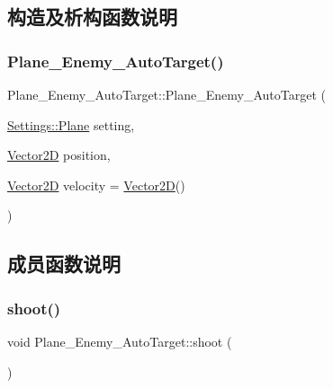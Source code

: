\subsection{构造及析构函数说明}
\mbox{\label{class_plane___enemy___auto_target_abf4224e6d4c79583016c98dc8747f3ad}} 
\subsubsection{\texorpdfstring{Plane\+\_\+\+Enemy\+\_\+\+Auto\+Target()}{Plane\_Enemy\_AutoTarget()}}
{\footnotesize\ttfamily Plane\+\_\+\+Enemy\+\_\+\+Auto\+Target\+::\+Plane\+\_\+\+Enemy\+\_\+\+Auto\+Target (\begin{DoxyParamCaption}\item[{\hyperlink{struct_settings_1_1_plane}{Settings\+::\+Plane}}]{setting,  }\item[{\hyperlink{_vector2_d_8hpp_aa1f1145650f1dd9bddf7335ec6434d7c}{Vector2D}}]{position,  }\item[{\hyperlink{_vector2_d_8hpp_aa1f1145650f1dd9bddf7335ec6434d7c}{Vector2D}}]{velocity = {\ttfamily \hyperlink{_vector2_d_8hpp_aa1f1145650f1dd9bddf7335ec6434d7c}{Vector2D}()} }\end{DoxyParamCaption})}



\subsection{成员函数说明}
\mbox{\label{class_plane___enemy___auto_target_a002ba5754abc49b37ab3131f1a8f48c7}} 
\subsubsection{\texorpdfstring{shoot()}{shoot()}}
{\footnotesize\ttfamily void Plane\+\_\+\+Enemy\+\_\+\+Auto\+Target\+::shoot (\begin{DoxyParamCaption}{ }\end{DoxyParamCaption})\hspace{0.3cm}{\ttfamily [virtual]}}



